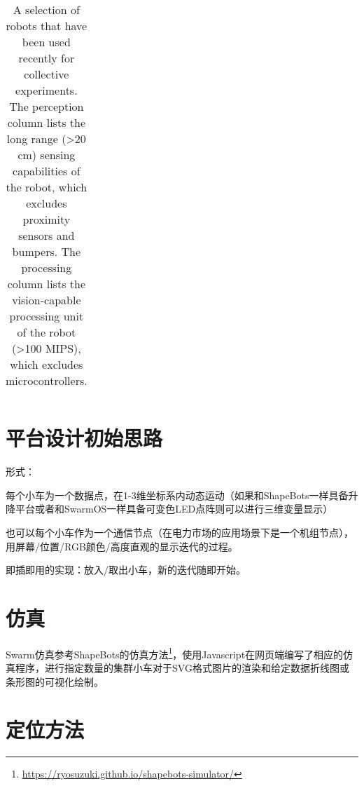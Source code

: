 \begin{landscape}
\begin{table}[]
\begin{tabular}{l|lllllll}
    \end{tabular}
    \caption{A selection of robots that have been used recently for collective experiments. The perception column lists the long range (\textgreater 20 cm) sensing capabilities of the robot, which excludes proximity sensors and bumpers. The processing column lists the vision-capable processing unit of the robot (\textgreater 100 MIPS), which excludes microcontrollers.\cite{bonani2010marxbot}}
    \label{tab:collective}
    \end{table}
\end{landscape}



\section{平台设计初始思路}
形式：

每个小车为一个数据点，在1-3维坐标系内动态运动（如果和ShapeBots\cite{suzuki2019shapebots}一样具备升降平台或者和SwarmOS一样具备可变色LED点阵则可以进行三维变量显示）

也可以每个小车作为一个通信节点（在电力市场的应用场景下是一个机组节点），用屏幕/位置/RGB颜色/高度直观的显示迭代的过程。

即插即用的实现：放入/取出小车，新的迭代随即开始。

\section{仿真}

Swarm仿真参考ShapeBots\cite{suzuki2019shapebots}的仿真方法\footnote{\href{https://ryosuzuki.github.io/shapebots-simulator/}{https://ryosuzuki.github.io/shapebots-simulator/}}，使用Javascript在网页端编写了相应的仿真程序，进行指定数量的集群小车对于SVG格式图片的渲染和给定数据折线图或条形图的可视化绘制。

\section{定位方法}

%  

